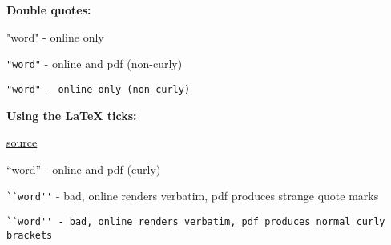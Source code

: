 \textbf{Double quotes:}

"word" - online only

\verb|"word"| - online and pdf (non-curly)

\begin{lstlisting}
"word" - online only (non-curly)
\end{lstlisting}

\textbf{Using the LaTeX ticks:}

\href{http://www.maths.tcd.ie/~dwilkins/LaTeXPrimer/QuotDash.html}{source}

``word'' - online and pdf (curly)

\verb|``word''| - bad, online renders verbatim, pdf produces strange quote marks

\begin{lstlisting}
``word'' - bad, online renders verbatim, pdf produces normal curly brackets
\end{lstlisting}

  
  